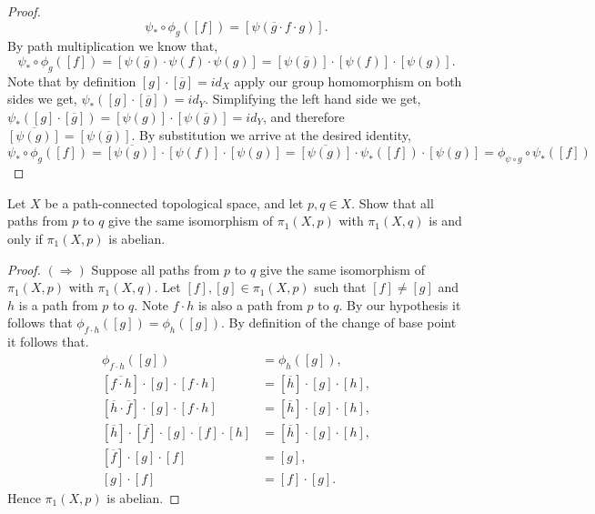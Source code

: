 \documentclass{homework651}
\begin{document}
\begin{problems}
\begin{enumerate}
\begin{proof}
\begin{equation*}
            \psi_* \circ \phi_{g}([f]) = [\psi(\overline{g} \cdot f\cdot g)].
        \end{equation*}
        By path multiplication we know that, 
        \begin{equation*}
            \psi_* \circ \phi_{g}([f]) = [\psi(\overline{g}) \cdot \psi(f)\cdot \psi(g)] = [\psi(\overline{g})] \cdot [\psi(f)]\cdot [\psi(g)].
        \end{equation*}
        Note that by definition $[g]\cdot[\overline{g}] = id_X$ apply our group homomorphism on both sides we get, 
         $\psi_*([g]\cdot[\overline{g}]) = id_Y$. Simplifying the left hand side we get, $\psi_*([g]\cdot[\overline{g}]) = [\psi(g)] \cdot [\psi(\overline{g})] = id_Y$, 
         and therefore $\overline{[\psi(g)]} = [\psi(\overline{g})]$. By substitution we arrive at the desired identity, 
         \begin{equation*}
              \psi_* \circ \phi_{g}([f])  = \overline{[\psi(g)]} \cdot [\psi(f)]\cdot [\psi(g)] = \overline{[\psi(g)]} \cdot \psi_*([f])\cdot [\psi(g)] = \phi_{\psi \circ g} \circ \psi_* ([f])
         \end{equation*}


    
    \end{proof}
\end{enumerate}
\problem Let $X$ be a path-connected topological space, and let $p, q \in X$. Show that all paths from $p$ to $q$ 
give the same isomorphism of $\pi_1(X, p)$ with $\pi_1(X, q)$ is and only if $\pi_1(X, p)$ is abelian. 
\begin{proof}$(\Rightarrow)$ Suppose all paths from $p$ to $q$  give the same isomorphism of $\pi_1(X, p)$ with $\pi_1(X, q)$.
    Let $[f], [g] \in \pi_1(X, p)$ such that $[f] \neq [g]$ and $h$ is a path from $p$ to $q$. Note $f \cdot h$ is 
    also a path from $p$ to $q$. By our hypothesis it follows that $\phi_{f \cdot h}([g]) = \phi_{h}([g])$.
    By definition of the change of base point it follows that. 
    \begin{align*}
        \phi_{f \cdot h}([g]) &= \phi_{h}([g]),\\
        [\overline{f\cdot h}] \cdot [g]\cdot [f\cdot h] &= [\overline{h}]\cdot[g]\cdot[h],\\
        [\overline{h} \cdot \overline{f}] \cdot [g]\cdot [f \cdot h] &= [\overline{h}]\cdot[g]\cdot[h],\\
        [\overline{h}] \cdot [\overline{f}] \cdot [g]\cdot [f] \cdot [h] &= [\overline{h}]\cdot[g]\cdot[h],\\
         [\overline{f}] \cdot [g]\cdot [f]  &= [g],\\
        [g]\cdot [f]  &= [f] \cdot[g].
    \end{align*}
    Hence $\pi_1(X, p)$ is abelian. 
\end{proof}


\end{problems}
\end{document}
